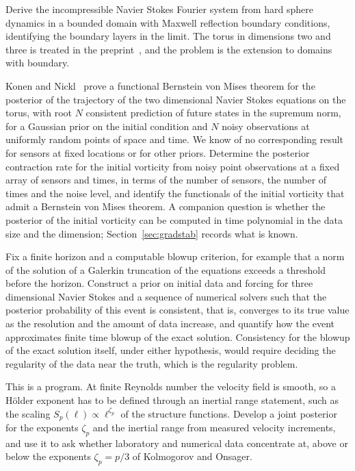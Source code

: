 \begin{problem}[Hydrodynamics]
Derive the incompressible Navier Stokes Fourier system from hard sphere dynamics in a bounded domain with Maxwell reflection boundary conditions, identifying the boundary layers in the limit. The torus in dimensions two and three is treated in the preprint~\cite{denghanima2025}, and the problem is the extension to domains with boundary.
\end{problem}

\begin{problem}[Inference]
\label{prob:inference}
Konen and Nickl~\cite{konennickl2026} prove a functional Bernstein von Mises theorem for the posterior of the trajectory of the two dimensional Navier Stokes equations on the torus, with root $N$ consistent prediction of future states in the supremum norm, for a Gaussian prior on the initial condition and $N$ noisy observations at uniformly random points of space and time. We know of no corresponding result for sensors at fixed locations or for other priors. Determine the posterior contraction rate for the initial vorticity from noisy point observations at a fixed array of sensors and times, in terms of the number of sensors, the number of times and the noise level, and identify the functionals of the initial vorticity that admit a Bernstein von Mises theorem. A companion question is whether the posterior of the initial vorticity can be computed in time polynomial in the data size and the dimension; Section~\ref{sec:gradstab} records what is known.
\end{problem}

\begin{problem}[Blowup]\label{prob:blowup}%
Fix a finite horizon and a computable blowup criterion, for example that a norm of the solution of a Galerkin truncation of the equations exceeds a threshold before the horizon. Construct a prior on initial data and forcing for three dimensional Navier Stokes and a sequence of numerical solvers such that the posterior probability of this event is consistent, that is, converges to its true value as the resolution and the amount of data increase, and quantify how the event approximates finite time blowup of the exact solution. Consistency for the blowup of the exact solution itself, under either hypothesis, would require deciding the regularity of the data near the truth, which is the regularity problem.
\end{problem}

\begin{problem}[Onsager]\label{prob:onsager}%
This is a program. At finite Reynolds number the velocity field is smooth, so a H\"older exponent has to be defined through an inertial range statement, such as the scaling $S_p(\ell)\propto\ell^{\zeta_p}$ of the structure functions. Develop a joint posterior for the exponents $\zeta_p$ and the inertial range from measured velocity increments, and use it to ask whether laboratory and numerical data concentrate at, above or below the exponents $\zeta_p = p/3$ of Kolmogorov and Onsager.
\end{problem}

